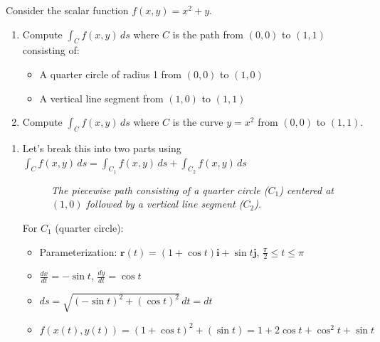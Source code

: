 \exampleline
\begin{example}
Consider the scalar function $f(x,y) = x^2 + y$.

\begin{enumerate}
\item Compute $\int_C f(x,y)\,ds$ where $C$ is the path from $(0,0)$ to $(1,1)$ consisting of:
\begin{itemize}
\item A quarter circle of radius 1 from $(0,0)$ to $(1,0)$
\item A vertical line segment from $(1,0)$ to $(1,1)$
\end{itemize}

\item Compute $\int_C f(x,y)\,ds$ where $C$ is the curve $y = x^2$ from $(0,0)$ to $(1,1)$.
\end{enumerate}

\begin{solution}
\begin{enumerate}
\item Let's break this into two parts using $\int_C f(x,y)\,ds = \int_{C_1} f(x,y)\,ds + \int_{C_2} f(x,y)\,ds$

\begin{figure}[H]
\centering
{}
\caption{\textit{The piecewise path consisting of a quarter circle ($C_1$) centered at $(1,0)$ followed by a vertical line segment ($C_2$).}}
\label{fig:piecewise_path}
\end{figure}

For $C_1$ (quarter circle):
\begin{itemize}
\item Parameterization: $\mathbf{r}(t) = (1 + \cos t)\mathbf{i} +\sin t\mathbf{j}$, $\frac{\pi}{2} \leq t \leq \pi$
\item $\frac{dx}{dt} = -\sin t$, $\frac{dy}{dt} = \cos t$
\item $ds = \sqrt{(-\sin t)^2 + (\cos t)^2}\,dt = dt$
\item $f(x(t),y(t)) = (1 + \cos t)^2 + (\sin t) = 1 + 2\cos t + \cos^2 t + \sin t$
\end{itemize}


\end{enumerate}
\end{solution}
\end{example}
